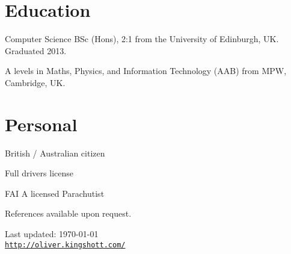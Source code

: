 \documentclass[a4paper]{article}
\def\footerlink{http://oliver.kingshott.com/}
\renewenvironment{itemize}{
  \begin{list}{}{
    \setlength{\leftmargin}{1.5em}
  }
}{
  \end{list}
}
\begin{document}
\section*{Education}
\begin{itemize}
  \item Computer Science BSc (Hons), 2:1 from the University of Edinburgh, UK. Graduated 2013. 
  \item A levels in Maths, Physics, and Information Technology (AAB) from MPW, Cambridge, UK.
\end{itemize}

\section*{Personal}

\begin{itemize}
\item British / Australian citizen
\item Full drivers license
\item FAI A licensed Parachutist
\item References available upon request.
\end{itemize}

\bigskip

\begin{center}
  \begin{footnotesize}
    Last updated: \today \\
    \href{\footerlink}{\texttt{\footerlink}}
  \end{footnotesize}
\end{center}
\end{document}
